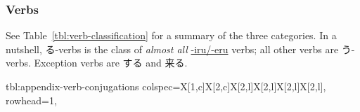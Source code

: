 \documentclass[../nihongo-gakushuu-kyouzai-grammar.tex]{subfiles}
\begin{document}
\subsubsection{Verbs}
See Table~\ref{tbl:verb-classification} for a summary of the three categories. In a nutshell, る-verbs is the class of \emph{almost all} \ul{-iru/-eru} verbs; all other verbs are う-verbs. Exception verbs are する and 来る. 

{tbl:appendix-verb-conjugations}  %
{}  %
{
    colspec={X[1,c]X[2,c]X[2,l]X[2,l]X[2,l]X[2,l]},
    rowhead=1,
}  %
\end{document}
